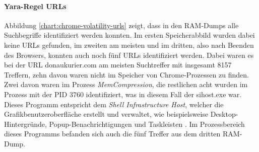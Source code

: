 \paragraph*{Yara-Regel \glqq{}URLs\grqq{}}\label{chap:ergebnisse-chrome-uncommon-volatility-urls}
Abbildung \ref{chart:chrome-volatility-urls} zeigt, dass in den RAM-Dumps alle Suchbegriffe identifiziert werden konnten. Im ersten Speicherabbild wurden dabei keine URLs gefunden, im zweiten am meisten und im dritten, also nach Beenden des Browsers, konnten auch noch fünf URLs identifiziert werden. Dabei waren es bei der URL \glqq{}donaukurier.com\grqq{} am meisten Suchtreffer mit insgesamt 8157 Treffern, zehn davon waren nicht im Speicher von Chrome-Prozessen zu finden. Zwei davon waren im Prozess \textit{MemCompression}, die restlichen acht wurden im Prozess mit der PID 3760 identifiziert, was in diesem Fall der sihost.exe war. Dieses Programm entspricht dem \textit{Shell Infrastructure Host}, welcher die Grafikbenutzeroberfläche erstellt und verwaltet, wie beispielsweise Desktop-Hintergründe, Popup-Benachrichtigungen und Taskleisten \cite{SiHostWebsite}. Im Prozessbereich dieses Programms befanden sich auch die fünf Treffer aus dem dritten RAM-Dump.

